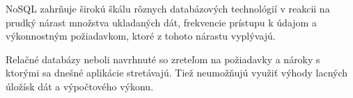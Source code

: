 	
	NoSQL zahrňuje širokú škálu rôznych databázových technológií v reakcii na prudký nárast množstva ukladaných dát, frekvencie prístupu k údajom a výkonnostným požiadavkom, ktoré z tohoto nárastu  vyplývajú.
	
	Relačné databázy neboli navrhnuté so zreteľom na požiadavky a nároky s ktorými sa dnešné aplikácie stretávajú. Tiež neumožňujú využiť výhody lacných úložísk dát a výpočtového výkonu.
	
